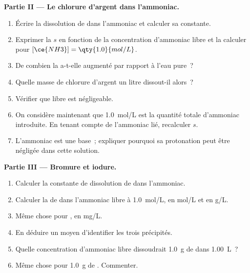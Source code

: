 \begin{problem}
\medskip
\noindent\textbf{Partie II --- Le chlorure d'argent dans l'ammoniac.}
\begin{enumerate}[resume]
  \item Écrire la dissolution de  dans l'ammoniac et calculer
        sa constante.
  \item Exprimer la  $s$ en fonction de la concentration
        d'ammoniac libre et la calculer pour $[\ce{NH3}] = \qty{1.0}{mol/L}$.
  \item De combien la  a-t-elle augmenté par rapport à l'eau
        pure~?
  \item Quelle masse de chlorure d'argent un litre dissout-il alors~?
  \item Vérifier que  libre est négligeable.
  \item On considère maintenant que \qty{1.0}{mol/L} est la quantité
        totale d'ammoniac introduite. En tenant compte de l'ammoniac lié,
        recalculer $s$.
  \item L'ammoniac est une base~; expliquer pourquoi sa protonation peut
        être négligée dans cette solution.
\end{enumerate}

\medskip
\noindent\textbf{Partie III --- Bromure et iodure.}
\begin{enumerate}[resume]
  \item Calculer la constante de dissolution de  dans
        l'ammoniac.
  \item Calculer la  de  dans l'ammoniac libre à
        \qty{1.0}{mol/L}, en \unit{mol/L} et en \unit{g/L}.
  \item Même chose pour , en \unit{mg/L}.
  \item En déduire un moyen d'identifier les trois précipités.
  \item Quelle concentration d'ammoniac libre dissoudrait \qty{1.0}{g} de
         dans \qty{1.00}{L}~?
  \item Même chose pour \qty{1.0}{g} de . Commenter.
\end{enumerate}


\end{problem}
